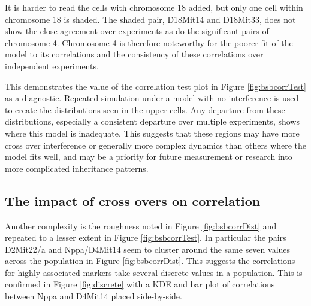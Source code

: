\documentclass[sts]{imsart}
\begin{document}
It is harder to read the cells with chromosome 18 added, but only one cell within chromosome 18 is shaded. The shaded pair, D18Mit14 and D18Mit33, does not show the close agreement over experiments as do the significant pairs of chromosome 4. Chromosome 4 is therefore noteworthy for the poorer fit of the model to its correlations and the consistency of these correlations over independent experiments.

This demonstrates the value of the correlation test plot in Figure \ref{fig:bsbcorrTest} as a diagnostic. Repeated simulation under a model with no interference is used to create the distributions seen in the upper cells. Any departure from these distributions, especially a consistent departure over multiple experiments, shows where this model is inadequate. This suggests that these regions may have more cross over interference or generally more complex dynamics than others where the model fits well, and may be a priority for future measurement or research into more complicated inheritance patterns.


\subsection{The impact of cross overs on correlation} \label{subsec:corrCountCO}

Another complexity is the roughness noted in Figure \ref{fig:bsbcorrDist} and repeated to a lesser extent in Figure \ref{fig:bsbcorrTest}. In particular the pairs D2Mit22/a and Nppa/D4Mit14 seem to cluster around the same seven values across the population in Figure \ref{fig:bsbcorrDist}. This suggests the correlations for highly associated markers take several discrete values in a population. This is confirmed in Figure \ref{fig:discrete} with a KDE and bar plot of correlations between Nppa and D4Mit14 placed side-by-side.
\end{document}
